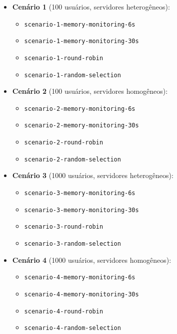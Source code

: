 \begin{itemize}
    \item \textbf{Cenário 1} (100 usuários, servidores heterogêneos):
    \begin{itemize}
        \item \texttt{scenario-1-memory-monitoring-6s}
        \item \texttt{scenario-1-memory-monitoring-30s}
        \item \texttt{scenario-1-round-robin}
        \item \texttt{scenario-1-random-selection}
    \end{itemize}
    
    \item \textbf{Cenário 2} (100 usuários, servidores homogêneos):
    \begin{itemize}
        \item \texttt{scenario-2-memory-monitoring-6s}
        \item \texttt{scenario-2-memory-monitoring-30s}
        \item \texttt{scenario-2-round-robin}
        \item \texttt{scenario-2-random-selection}
    \end{itemize}
    
    \item \textbf{Cenário 3} (1000 usuários, servidores heterogêneos):
    \begin{itemize}
        \item \texttt{scenario-3-memory-monitoring-6s}
        \item \texttt{scenario-3-memory-monitoring-30s}
        \item \texttt{scenario-3-round-robin}
        \item \texttt{scenario-3-random-selection}
    \end{itemize}
    
    \item \textbf{Cenário 4} (1000 usuários, servidores homogêneos):
    \begin{itemize}
        \item \texttt{scenario-4-memory-monitoring-6s}
        \item \texttt{scenario-4-memory-monitoring-30s}
        \item \texttt{scenario-4-round-robin}
        \item \texttt{scenario-4-random-selection}
    \end{itemize}
\end{itemize}


